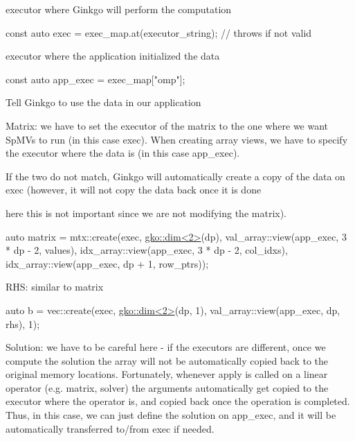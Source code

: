 executor where Ginkgo will perform the computation


\begin{DoxyCode}
\textcolor{keyword}{const} \textcolor{keyword}{auto} exec = exec\_map.at(executor\_string);  \textcolor{comment}{// throws if not valid}
\end{DoxyCode}


executor where the application initialized the data


\begin{DoxyCode}
\textcolor{keyword}{const} \textcolor{keyword}{auto} app\_exec = exec\_map[\textcolor{stringliteral}{"omp"}];
\end{DoxyCode}


Tell Ginkgo to use the data in our application

Matrix\+: we have to set the executor of the matrix to the one where we want Sp\+M\+Vs to run (in this case {\ttfamily exec}). When creating array views, we have to specify the executor where the data is (in this case {\ttfamily app\+\_\+exec}).

If the two do not match, Ginkgo will automatically create a copy of the data on {\ttfamily exec} (however, it will not copy the data back once it is done
\begin{DoxyItemize}
\item here this is not important since we are not modifying the matrix).
\end{DoxyItemize}


\begin{DoxyCode}
\textcolor{keyword}{auto} matrix = mtx::create(exec, \hyperlink{structgko_1_1dim}{gko::dim<2>}(dp),
                          val\_array::view(app\_exec, 3 * dp - 2, values),
                          idx\_array::view(app\_exec, 3 * dp - 2, col\_idxs),
                          idx\_array::view(app\_exec, dp + 1, row\_ptrs));
\end{DoxyCode}


R\+HS\+: similar to matrix


\begin{DoxyCode}
\textcolor{keyword}{auto} b = vec::create(exec, \hyperlink{structgko_1_1dim}{gko::dim<2>}(dp, 1),
                     val\_array::view(app\_exec, dp, rhs), 1);
\end{DoxyCode}


Solution\+: we have to be careful here -\/ if the executors are different, once we compute the solution the array will not be automatically copied back to the original memory locations. Fortunately, whenever {\ttfamily apply} is called on a linear operator (e.\+g. matrix, solver) the arguments automatically get copied to the executor where the operator is, and copied back once the operation is completed. Thus, in this case, we can just define the solution on {\ttfamily app\+\_\+exec}, and it will be automatically transferred to/from {\ttfamily exec} if needed.


